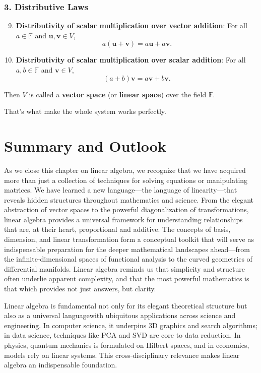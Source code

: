 \documentclass[oneside]{book}
\begin{document}
\subsubsection*{3. Distributive Laws}
\begin{enumerate}
    \setcounter{enumi}{8}
    \item \textbf{Distributivity of scalar multiplication over vector addition}: For all $a \in \mathbb{F}$ and $\mathbf{u}, \mathbf{v} \in V$,
    \[
    a (\mathbf{u} + \mathbf{v}) = a \mathbf{u} + a \mathbf{v}.
    \]
    \item \textbf{Distributivity of scalar multiplication over scalar addition}: For all $a, b \in \mathbb{F}$ and $\mathbf{v} \in V$,
    \[
    (a + b) \mathbf{v} = a \mathbf{v} + b \mathbf{v}.
    \]
\end{enumerate}

Then $V$ is called a \textbf{vector space} (or \textbf{linear space}) over the field $\mathbb{F}$.

That's what make the whole system works perfectly.

\section{Summary and Outlook}

As we close this chapter on linear algebra, we recognize that we have acquired more than just a collection of techniques for solving equations or manipulating matrices. We have learned a new language—the language of linearity—that reveals hidden structures throughout mathematics and science. From the elegant abstraction of vector spaces to the powerful diagonalization of transformations, linear algebra provides a universal framework for understanding relationships that are, at their heart, proportional and additive. The concepts of basis, dimension, and linear transformation form a conceptual toolkit that will serve as indispensable preparation for the deeper mathematical landscapes ahead—from the infinite-dimensional spaces of functional analysis to the curved geometries of differential manifolds. Linear algebra reminds us that simplicity and structure often underlie apparent complexity, and that the most powerful mathematics is that which provides not just answers, but clarity.

Linear algebra is fundamental not only for its elegant theoretical structure but also as a universal languagewith ubiquitous applications across science and engineering. In computer science, it underpins 3D graphics and search algorithms; in data science, techniques like PCA and SVD are core to data reduction. In physics, quantum mechanics is formulated on Hilbert spaces, and in economics, models rely on linear systems. This cross-disciplinary relevance makes linear algebra an indispensable foundation.
\end{document}
